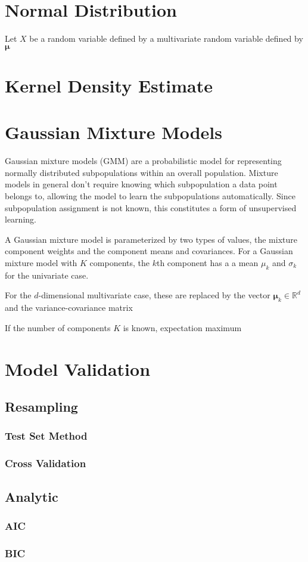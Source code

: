 \section{Normal Distribution}

Let $X$ be a random variable defined by a multivariate random variable defined by $\bm{\mu}$

\section{Kernel Density Estimate}

\section{Gaussian Mixture Models}

Gaussian mixture models (GMM) are a probabilistic model for representing normally distributed subpopulations within an overall population. Mixture models in general don't require knowing which subpopulation a data point belongs to, allowing the model to learn the subpopulations automatically. Since subpopulation assignment is not known, this constitutes a form of unsupervised learning.

A Gaussian mixture model is parameterized by two types of values, the mixture component weights and the component means and covariances.  For a Gaussian mixture model with $K$ components, the $k$th component has a a mean $\mu_k$ and $\sigma_k$ for the univariate case.  

For the $d$-dimensional multivariate case, these are replaced by the vector $\bm{\mu}_k \in \mathbb{R}^d$ and the variance-covariance matrix

If the number of components $K$ is known, expectation maximum

\section{Model Validation}

\subsection{Resampling}
\subsubsection{Test Set Method}
\subsubsection{Cross Validation}
\subsection{Analytic}
\subsubsection{AIC}
\subsubsection{BIC}


